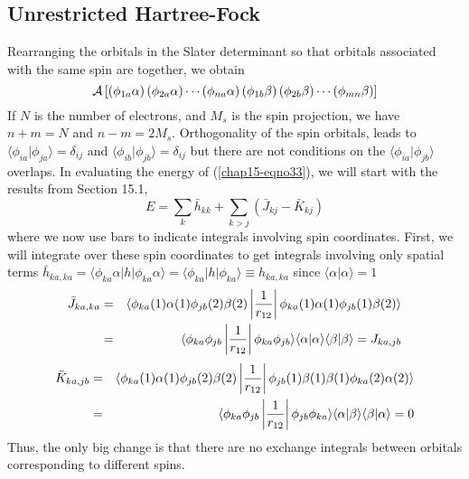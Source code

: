 \subsection{Unrestricted Hartree-Fock}

Rearranging the orbitals in the Slater determinant so that orbitals
associated with the same spin are together, we obtain
\begin{equation}
{\cal A} \left[ \left( \phi_{1a} \alpha \right) \left( \phi_{2a} 
\alpha \right) \cdots \left( \phi_{na} \alpha \right) \left( 
\phi_{1b} \beta \right) \left( \phi_{2b} \beta \right) \cdots \left( 
\phi_{mn} \beta \right) \right]
\label{chap15-eqno33}
\end{equation}
If $N$ is the number of electrons, and $M_s$ is the spin projection, we have
$n + m = N$ and $n - m = 2M_s$.  Orthogonality of the spin orbitals, leads
to $\langle \phi_{ia} | \phi_{ja} \rangle = \delta_{ij}$ and $\langle 
\phi_{ib} | \phi_{jb} \rangle = \delta_{ij}$ but there are not conditions 
on the $\langle \phi_{ia} | \phi_{jb} \rangle$ overlaps. In evaluating
the energy of (\ref{chap15-eqno33}), we will start with the results
from Section 15.1,
\begin{equation}
E = \sum_{k} {\bar{h}}_{kk} + \sum_{k>j} \left( {\bar{J}}_{kj} - 
{\bar{K}}_{kj} \right)
\end{equation}
where we now use bars to indicate integrals involving spin coordinates. 
First, we will integrate over these spin coordinates to get integrals 
involving only spatial terms
${\bar{h}}_{ka,ka} = \langle \phi_{ka} \alpha | h | \phi_{ka} \alpha 
\rangle = \langle \phi_{ka} | h | \phi_{ka} \rangle \equiv h_{ka,ka}$
since $\langle \alpha | \alpha \rangle = 1$
\begin{eqnarray}
{\bar{J}}_{ka,ka} &=& \langle \phi_{ka} (1) \alpha (1) \phi_{jb} (2) 
\beta (2) \left| {1 \over r_{12}} \right| \phi_{ka} (1) \alpha (1) 
\phi_{jb} (1) \beta (2) \rangle\cr
&=& \langle \phi_{ka} \phi_{jb} \left| {1 \over r_{12}} \right| 
\phi_{ka} \phi_{jb} \rangle \langle \alpha | \alpha \rangle \langle 
\beta | \beta \rangle = J_{ka,jb}
\end{eqnarray}
\begin{eqnarray}
{\bar{K}}_{ka,jb} &=& \langle \phi_{ka} (1) \alpha (1) \phi_{jb} (2) 
\beta (2) \left| {1 \over r_{12}} \right| \phi_{jb} (1) \beta (1) 
\beta (1) \phi_{ka} (2) \alpha (2) \rangle\cr
&=& \langle \phi_{ka} \phi_{jb} \left| {1 \over r_{12}} \right| 
\phi_{jb} \phi_{ka} \rangle \langle \alpha | \beta \rangle \langle 
\beta | \alpha \rangle = 0
\end{eqnarray}
Thus, the only big change is that there are no exchange integrals between
orbitals corresponding to different spins.

